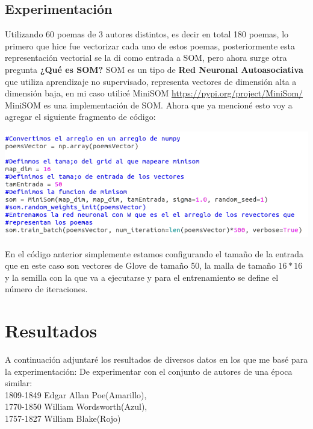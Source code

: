 \documentclass[a4paper, 11pt, oneside]{article}
\begin{document}
\subsection*{Experimentación}
Utilizando 60 poemas de 3 autores distintos, es decir en total 180 poemas, lo primero que hice fue vectorizar cada uno de estos poemas, posteriormente esta representación vectorial se la di como entrada a SOM, pero ahora surge otra pregunta \textbf{¿Qué es SOM?} SOM es un tipo de \textbf{Red Neuronal Autoasociativa} que utiliza aprendizaje no supervisado, representa vectores de dimensión alta a dimensión baja, en mi caso utilicé MiniSOM \url{https://pypi.org/project/MiniSom/} MiniSOM es una implementación de SOM. Ahora que ya mencioné esto voy a agregar el siguiente fragmento de código:
\begin{center}
    \includegraphics[scale=0.50]{Imagenes/SOM.png}
\end{center}
En el código anterior simplemente estamos configurando el tamaño de la entrada que en este caso son vectores de Glove de tamaño 50, la malla de tamaño $16 * 16$ y la semilla con la que va a ejecutarse y para el entrenamiento se define el número de iteraciones.
\section*{Resultados}
A continuación adjuntaré los resultados de diversos datos en los que me basé para la experimentación:
De experimentar con el conjunto de autores de una época similar:\\ 
1809-1849 Edgar Allan Poe(Amarillo),\\
1770-1850 William Wordsworth(Azul),\\
1757-1827 William Blake(Rojo)
\end{document}

